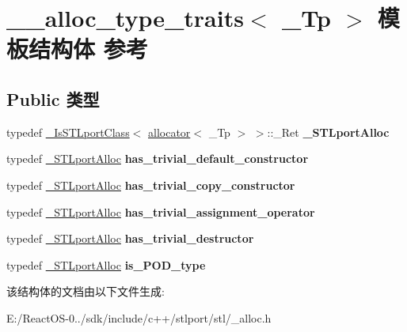 \hypertarget{struct____alloc__type__traits}{}\section{\+\_\+\+\_\+alloc\+\_\+type\+\_\+traits$<$ \+\_\+\+Tp $>$ 模板结构体 参考}
\label{struct____alloc__type__traits}
\subsection*{Public 类型}
\begin{DoxyCompactItemize}
\item 
\mbox{\label{struct____alloc__type__traits_af25b54cd919f4b706bc04d685ba7fe29}} 
typedef \hyperlink{struct___is_s_t_lport_class}{\+\_\+\+Is\+S\+T\+Lport\+Class}$<$ \hyperlink{classallocator}{allocator}$<$ \+\_\+\+Tp $>$ $>$\+::\+\_\+\+Ret {\bfseries \+\_\+\+S\+T\+Lport\+Alloc}
\item 
\mbox{\label{struct____alloc__type__traits_a64bf97f67066642bd011e926c951db16}} 
typedef \hyperlink{struct____true__type}{\+\_\+\+S\+T\+Lport\+Alloc} {\bfseries has\+\_\+trivial\+\_\+default\+\_\+constructor}
\item 
\mbox{\label{struct____alloc__type__traits_af0c619d330b28a7d4e74a8699ace20f0}} 
typedef \hyperlink{struct____true__type}{\+\_\+\+S\+T\+Lport\+Alloc} {\bfseries has\+\_\+trivial\+\_\+copy\+\_\+constructor}
\item 
\mbox{\label{struct____alloc__type__traits_a66b0e5275016bd4e211f54d65afdc661}} 
typedef \hyperlink{struct____true__type}{\+\_\+\+S\+T\+Lport\+Alloc} {\bfseries has\+\_\+trivial\+\_\+assignment\+\_\+operator}
\item 
\mbox{\label{struct____alloc__type__traits_aa045341113a2d8619c66057c337e22a2}} 
typedef \hyperlink{struct____true__type}{\+\_\+\+S\+T\+Lport\+Alloc} {\bfseries has\+\_\+trivial\+\_\+destructor}
\item 
\mbox{\label{struct____alloc__type__traits_a8cd66b79c287690b49ed272964e90a1c}} 
typedef \hyperlink{struct____true__type}{\+\_\+\+S\+T\+Lport\+Alloc} {\bfseries is\+\_\+\+P\+O\+D\+\_\+type}
\end{DoxyCompactItemize}


该结构体的文档由以下文件生成\+:\begin{DoxyCompactItemize}
\item 
E\+:/\+React\+O\+S-\/0../sdk/include/c++/stlport/stl/\+\_\+alloc.\+h\end{DoxyCompactItemize}
